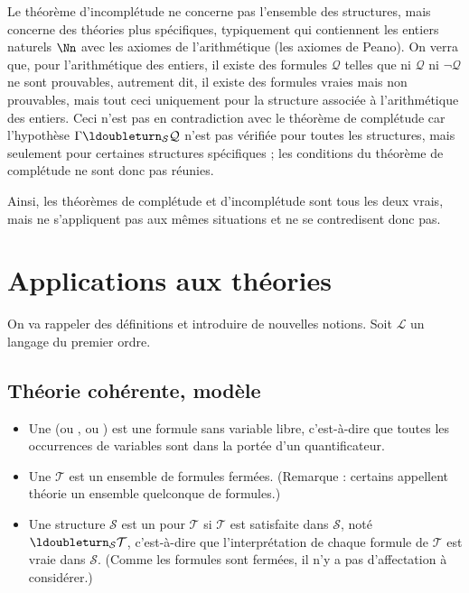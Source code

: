 \documentclass[11pt,class=report,crop=false]{standalone}
\begin{document}
Le théorème d'incomplétude ne concerne pas l'ensemble des structures, mais concerne des théories plus spécifiques, typiquement qui contiennent les entiers naturels $\Nn$ avec les axiomes de l'arithmétique (les axiomes de Peano).
On verra que, pour l'arithmétique des entiers, il existe des formules $\mathcal{Q}$ telles que ni $\mathcal{Q}$ ni $\lnot \mathcal{Q}$ ne sont prouvables, autrement dit, il existe des formules vraies mais non prouvables, mais tout ceci uniquement pour la structure associée à l'arithmétique des entiers.
Ceci n'est pas en contradiction avec le théorème de complétude car l'hypothèse \og{}$\Gamma \ldoubleturn_{\mathcal{S}} \mathcal{Q}$\fg{} n'est pas vérifiée pour toutes les structures, mais seulement pour certaines structures spécifiques ; les conditions du théorème de complétude ne sont donc pas réunies. 

Ainsi, les théorèmes de complétude et d'incomplétude sont tous les deux vrais, mais ne s'appliquent pas aux mêmes situations et ne se contredisent donc pas.


\section{Applications aux théories}

On va rappeler des définitions et introduire de nouvelles notions.
Soit $\mathcal{L}$ un langage du premier ordre. 

\subsection{Théorie cohérente, modèle}

\begin{itemize}
	\item Une  (ou , ou ) est une formule sans variable libre, c'est-à-dire que toutes les occurrences de variables sont dans la portée d'un quantificateur.
	
	\item Une  $\mathcal{T}$ est un ensemble de formules fermées. (Remarque : certains appellent \og{}théorie\fg{} un ensemble quelconque de formules.)
	
	\item Une structure $\mathcal{S}$ est un  pour $\mathcal{T}$ si $\mathcal{T}$ est satisfaite dans $\mathcal{S}$, noté $\ldoubleturn_{\mathcal{S}} \mathcal{T}$, c'est-à-dire que l'interprétation de chaque formule de $\mathcal{T}$ est vraie dans $\mathcal{S}$. (Comme les formules sont fermées, il n'y a pas d'affectation à considérer.)
\end{itemize}
\end{document}
